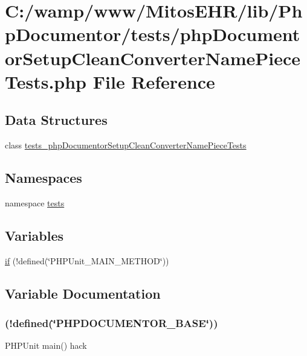 \hypertarget{php_documentor_setup_clean_converter_name_piece_tests_8php}{\section{\-C\-:/wamp/www/\-Mitos\-E\-H\-R/lib/\-Php\-Documentor/tests/php\-Documentor\-Setup\-Clean\-Converter\-Name\-Piece\-Tests.php \-File \-Reference}
\label{php_documentor_setup_clean_converter_name_piece_tests_8php}
}
\subsection*{\-Data \-Structures}
\begin{DoxyCompactItemize}
\item 
class \hyperlink{classtests__php_documentor_setup_clean_converter_name_piece_tests}{tests\-\_\-php\-Documentor\-Setup\-Clean\-Converter\-Name\-Piece\-Tests}
\end{DoxyCompactItemize}
\subsection*{\-Namespaces}
\begin{DoxyCompactItemize}
\item 
namespace \hyperlink{namespacetests}{tests}
\end{DoxyCompactItemize}
\subsection*{\-Variables}
\begin{DoxyCompactItemize}
\item 
\hyperlink{php_documentor_setup_clean_converter_name_piece_tests_8php_ae3cacee49c3c7d622bb92397daeb7733}{if} (!defined(\char`\"{}\-P\-H\-P\-Unit\-\_\-\-M\-A\-I\-N\-\_\-\-M\-E\-T\-H\-O\-D\char`\"{}))
\end{DoxyCompactItemize}


\subsection{\-Variable \-Documentation}
\hypertarget{php_documentor_setup_clean_converter_name_piece_tests_8php_ae3cacee49c3c7d622bb92397daeb7733}{
\subsubsection[{if}]{(!defined(\char`\"{}\-P\-H\-P\-D\-O\-C\-U\-M\-E\-N\-T\-O\-R\-\_\-\-B\-A\-S\-E\char`\"{}))}}\label{php_documentor_setup_clean_converter_name_piece_tests_8php_ae3cacee49c3c7d622bb92397daeb7733}
\-P\-H\-P\-Unit main() hack

